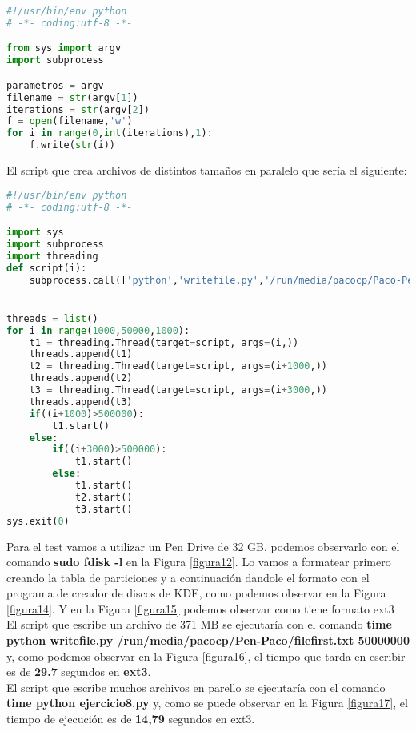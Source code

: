 \begin{lstlisting}[language=python]
#!/usr/bin/env python
# -*- coding:utf-8 -*-

from sys import argv
import subprocess

parametros = argv
filename = str(argv[1])
iterations = str(argv[2])
f = open(filename,'w')
for i in range(0,int(iterations),1):
	f.write(str(i))

\end{lstlisting}

El script que crea archivos de distintos tamaños en paralelo que sería el siguiente:\\

\begin{lstlisting}[language=python]
#!/usr/bin/env python
# -*- coding:utf-8 -*-

import sys
import subprocess
import threading 
def script(i):
	subprocess.call(['python','writefile.py','/run/media/pacocp/Paco-Pen/file'+str(i)+'.txt',str(i)])


threads = list()
for i in range(1000,50000,1000):
	t1 = threading.Thread(target=script, args=(i,))
	threads.append(t1)
	t2 = threading.Thread(target=script, args=(i+1000,))
	threads.append(t2)
	t3 = threading.Thread(target=script, args=(i+3000,))
	threads.append(t3)
	if((i+1000)>500000):
		t1.start()
	else:
		if((i+3000)>500000):
			t1.start()
		else:
			t1.start()
			t2.start()
			t3.start()
sys.exit(0)


\end{lstlisting}

Para el test vamos a utilizar un Pen Drive de 32 GB, podemos observarlo con el comando \textbf{sudo fdisk -l} en la Figura \ref{figura12}. Lo vamos a formatear primero   creando la tabla de particiones y a continuación dandole el formato con el programa de creador de discos de KDE, como podemos observar en la Figura \ref{figura14}. Y en la Figura \ref{figura15} podemos observar como tiene formato ext3\\
 
El script que escribe un archivo de 371 MB se ejecutaría con el comando \textbf{time python writefile.py /run/media/pacocp/Pen-Paco/filefirst.txt 50000000} y, como podemos observar en la Figura \ref{figura16}, el tiempo que tarda en escribir es de \textbf{29.7} segundos en \textbf{ext3}.\\

El script que escribe muchos archivos en parello se ejecutaría con el comando \textbf{time python ejercicio8.py} y, como se puede observar en la Figura \ref{figura17}, el tiempo de ejecución es de \textbf{14,79} segundos en ext3.\\


